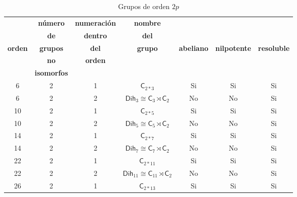 \documentclass[final,12pt,a4paper,twoside,fleqn]{extbook}
\theoremstyle{definition}
\theoremstyle{remark}
\begin{document}
\begin{table}[h!]
    \begin{center}
        \caption{Grupos de orden $2p$}
        \label{tab:GruposOrden2p}
        \begin{tabular}{c|c|c|c|c|c|c} %
            \textbf{} & \tiny\textbf{n\'umero} &\tiny\textbf{numeraci\'on} & \tiny\textbf{nombre} & \textbf{} & {} & {} \\
            \textbf{} & \tiny\textbf{de} &\tiny\textbf{dentro} & \tiny\textbf{del} & \tiny\textbf{} & {} & {} \\
            \tiny\textbf{orden} & \tiny\textbf{grupos} & \tiny\textbf{del} & \tiny\textbf{grupo} & \tiny\textbf{abeliano}  & \tiny\textbf{nilpotente} & \tiny\textbf{resoluble} \\
            \textbf{} & \tiny\textbf{no} & \tiny\textbf{orden} & \textbf{} & \textbf{} & {} & {} \\
            \textbf{} & \tiny\textbf{isomorfos} &\textbf{} & \textbf{} & \textbf{} & {} & {} \\
            \hline
            6 & 2 & 1 & ${\textsf{C}}_{2*3}$ & Si & Si & Si \\
            \hline
            6 & 2 & 2  & ${{\textsf{Dih}}_{3}}                    \cong                    {{\textsf{C}}_{3}}\rtimes{{{\textsf{C}}_{2}}}$ & No & No & Si \\
            \hline
            10 & 2 & 1 & ${\textsf{C}}_{2*5}$ & Si & Si & Si \\
            \hline
            10 & 2 & 2  & ${{\textsf{Dih}}_{5}}                    \cong                    {{\textsf{C}}_{5}}\rtimes{{{\textsf{C}}_{2}}}$ & No & No & Si \\
            \hline
            14 & 2 & 1 & ${\textsf{C}}_{2*7}$ & Si & Si & Si \\
            \hline
            14 & 2 & 2  & ${{\textsf{Dih}}_{7}}                    \cong                    {{\textsf{C}}_{7}}\rtimes{{{\textsf{C}}_{2}}}$ & No & No & Si \\
            \hline
            22 & 2 & 1 & ${\textsf{C}}_{2*11}$ & Si & Si & Si \\
            \hline
            22 & 2 & 2  & ${{\textsf{Dih}}_{11}}                    \cong                    {{\textsf{C}}_{11}}\rtimes{{{\textsf{C}}_{2}}}$ & No & No & Si \\
            \hline
            26 & 2 & 1 & ${\textsf{C}}_{2*13}$ & Si & Si & Si \\

\end{tabular}
\end{center}
\end{table}
\end{document}

